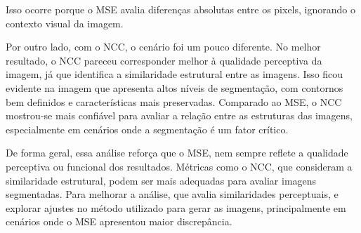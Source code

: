 Isso ocorre porque o MSE avalia diferenças absolutas entre os pixels, ignorando o contexto visual da imagem. 

Por outro lado, com o NCC, o cenário foi um pouco diferente. No melhor resultado, o NCC pareceu corresponder melhor à qualidade perceptiva da imagem, já que identifica a similaridade estrutural entre as imagens. Isso ficou evidente na imagem que apresenta altos níveis de segmentação, com contornos bem definidos e características mais preservadas. Comparado ao MSE, o NCC mostrou-se mais confiável para avaliar a relação entre as estruturas das imagens, especialmente em cenários onde a segmentação é um fator crítico.

De forma geral, essa análise reforça que o MSE, nem sempre reflete a qualidade perceptiva ou funcional dos resultados. Métricas como o NCC, que consideram a similaridade estrutural, podem ser mais adequadas para avaliar imagens segmentadas. Para melhorar a análise, que avalia similaridades perceptuais, e explorar ajustes no método utilizado para gerar as imagens, principalmente em cenários onde o MSE apresentou maior discrepância.
